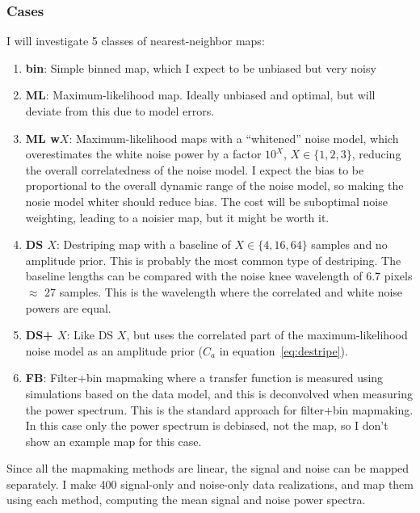 \documentclass[twocolumn,apj]{aastex63}
\newcommand{\dfn}[1]{\textbf{#1}}
\begin{document}
\subsubsection{Cases}
\label{sec:2d-cases}
I will investigate 5 classes of nearest-neighbor maps:
\begin{enumerate}
	\item \dfn{bin}: Simple binned map, which I expect to be unbiased but very noisy
	\item \dfn{ML}: Maximum-likelihood map. Ideally unbiased and optimal, but will deviate
		from this due to model errors.
	\item \dfn{ML w$X$}: Maximum-likelihood maps with a ``whitened'' noise model,
		which overestimates the
		white noise power by a factor $10^X$, $X\in\{1,2,3\}$, reducing the overall
		correlatedness of the noise model. I expect the bias to be proportional to the
		overall dynamic range of the noise model,
		so making the nosie model whiter should reduce bias. The cost will be suboptimal noise
		weighting, leading to a noisier map, but it might be worth it.
	\item \dfn{DS $X$}: Destriping map with a baseline of $X\in \{4,16,64\}$ samples and no amplitude
		prior. This is probably the most common type of destriping. The baseline lengths
		can be compared with the noise knee wavelength of 6.7 pixels $\approx$ 27 samples.
		This is the wavelength where the correlated and white noise powers are equal.
	\item \dfn{DS+ $X$}: Like DS $X$, but uses the correlated part of the maximum-likelihood
		noise model as an amplitude prior ($C_a$ in equation~\ref{eq:destripe}).
	\item \dfn{FB}: Filter+bin mapmaking where a transfer function is measured using
		simulations based on the data model, and this is deconvolved when measuring
		the power spectrum. This is the standard approach for filter+bin mapmaking.
		In this case only the power spectrum is debiased, not the map, so I don't
		show an example map for this case.
\end{enumerate}

Since all the mapmaking methods are linear, the signal and noise can be mapped separately.
I make 400 signal-only and noise-only data realizations, and map them using each method,
computing the mean signal and noise power spectra.
\end{document}
